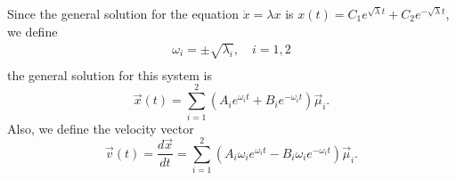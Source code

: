 \documentclass[12pt]{article}%
\begin{document}
	Since the general solution for the equation $\ddot{x} = \lambda x$ is $x\left(t\right) = C_1e^{\sqrt{\lambda} t} + C_2e^{-\sqrt{\lambda} t}$, we define
	\begin{equation}
	\begin{aligned}
	\omega_{i} = \pm\sqrt{\lambda_{i}},	\quad i = 1,2\\
	\end{aligned}
	\end{equation}
	the general solution for this system is
	\begin{equation}
	\vec{x}\left(t\right) = \sum_{i=1}^{2}\left(A_{i}e^{\omega_i t}+ B_{i}e^{-\omega_i t}\right)\vec{\mu}_i.
	\end{equation}
	Also, we define the velocity vector
	\begin{equation}
	\vec{v}\left(t\right) = \frac{d\vec{x}}{dt} = \sum_{i=1}^{2}\left(A_{i}\omega_ie^{\omega_i t}-B_{i}\omega_ie^{-\omega_i t}\right)\vec{\mu}_i.
	\end{equation}
\end{document}
